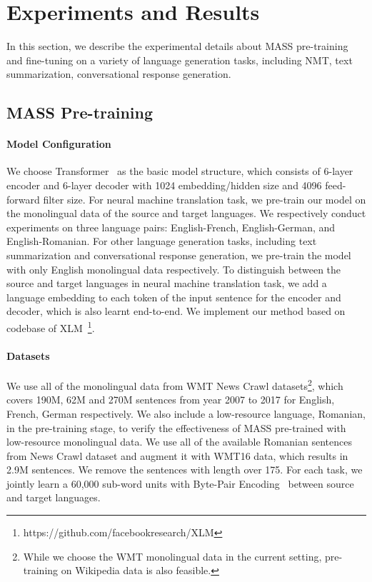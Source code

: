 \documentclass{article}
\begin{document}
	\section{Experiments and Results}
	\label{sec_exp}
	In this section, we describe the experimental details about MASS pre-training and fine-tuning on a variety of language generation tasks, including NMT, text summarization, conversational response generation.
	
	\subsection{MASS Pre-training}
	
	\paragraph{Model Configuration} We choose Transformer~\cite{DBLP:conf/nips/VaswaniSPUJGKP17} as the basic model structure, which consists of 6-layer encoder and 6-layer decoder with 1024 embedding/hidden size and 4096 feed-forward filter size. For neural machine translation task, we pre-train our model on the monolingual data of the source and target languages. We respectively conduct experiments on three language pairs: English-French, English-German, and English-Romanian. For other language generation tasks, including text summarization and conversational response generation, we pre-train the model with only English monolingual data respectively. 
	To distinguish between the source and target languages in neural machine translation task, we add a language embedding to each token of the input sentence for the encoder and decoder, which is also learnt end-to-end. We implement our method based on codebase of XLM~\footnote{https://github.com/facebookresearch/XLM}. 


	\paragraph{Datasets} We use all of the monolingual data from WMT News Crawl datasets\footnote{While we choose the WMT monolingual data in the current setting, pre-training on Wikipedia data is also feasible.}, which covers 190M, 62M and 270M sentences from year 2007 to 2017 for English, French, German respectively. We also include a low-resource language, Romanian, in the pre-training stage, to verify the effectiveness of MASS pre-trained with low-resource monolingual data. We use all of the available Romanian sentences from News Crawl dataset and augment it with WMT16 data, which results in 2.9M sentences. We remove the sentences with length over 175. For each task, we jointly learn a 60,000 sub-word units with Byte-Pair Encoding~\citep{sennrich2016neural} between source and target languages.
	
\end{document}
